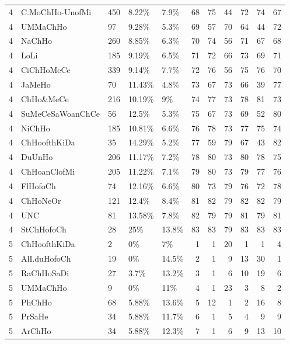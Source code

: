 \begin{longtable}{lllllrrrrrr}
  4 & C.MoChHo-UnofMi & 450 & 8.22\% & 7.9\% &  68 &  75 &  44 &  72 &  74 &  67 \\ 
  4 & UMMaChHo & 97 & 9.28\% & 5.3\% &  69 &  57 &  70 &  64 &  44 &  72 \\ 
  4 & NaChHo & 260 & 8.85\% & 6.3\% &  70 &  74 &  56 &  71 &  67 &  68 \\ 
  4 & LoLi & 185 & 9.19\% & 6.5\% &  71 &  72 &  66 &  73 &  69 &  71 \\ 
  4 & CiChHoMeCe & 339 & 9.14\% & 7.7\% &  72 &  76 &  56 &  75 &  76 &  70 \\ 
  4 & JaMeHo & 70 & 11.43\% & 4.8\% &  73 &  67 &  73 &  66 &  39 &  77 \\ 
  4 & ChHo\&MeCe & 216 & 10.19\% & 9\% &  74 &  77 &  73 &  78 &  81 &  73 \\ 
  4 & SuMeCeSaWoanChCe & 56 & 12.5\% & 5.3\% &  75 &  67 &  73 &  69 &  52 &  80 \\ 
  4 & NiChHo & 185 & 10.81\% & 6.6\% &  76 &  78 &  73 &  77 &  75 &  74 \\ 
  4 & ChHoofthKiDa & 35 & 14.29\% & 5.2\% &  77 &  59 &  79 &  67 &  43 &  82 \\ 
  4 & DuUnHo & 206 & 11.17\% & 7.2\% &  78 &  80 &  73 &  80 &  78 &  75 \\ 
  4 & ChHoanClofMi & 205 & 11.22\% & 7.1\% &  79 &  80 &  73 &  79 &  77 &  76 \\ 
  4 & FlHofoCh & 74 & 12.16\% & 6.6\% &  80 &  73 &  79 &  76 &  72 &  78 \\ 
  4 & ChHoNeOr & 121 & 12.4\% & 8.4\% &  81 &  82 &  79 &  82 &  82 &  79 \\ 
  4 & UNC & 81 & 13.58\% & 7.8\% &  82 &  79 &  79 &  81 &  79 &  81 \\ 
  4 & StChHofoCh & 28 & 25\% & 13.8\% &  83 &  83 &  79 &  83 &  83 &  83 \\ 
  5 & ChHoofthKiDa & 2 & 0\% & 7\% &   1 &   1 &  20 &   1 &   1 &   4 \\ 
  5 & AlI.duHofoCh & 19 & 0\% & 14.5\% &   2 &   1 &   9 &  13 &  30 &   1 \\ 
  5 & RaChHoSaDi & 27 & 3.7\% & 13.2\% &   3 &   1 &   6 &  10 &  19 &   6 \\ 
  5 & UMMaChHo & 9 & 0\% & 11\% &   4 &   1 &  23 &   3 &   8 &   2 \\ 
  5 & PhChHo & 68 & 5.88\% & 13.6\% &   5 &  12 &   1 &   2 &  16 &   8 \\ 
  5 & PrSaHe & 34 & 5.88\% & 11.7\% &   6 &   1 &   5 &   4 &   9 &   9 \\ 
  5 & ArChHo & 34 & 5.88\% & 12.3\% &   7 &   1 &   6 &   9 &  13 &  10 \\ 

\end{longtable}
